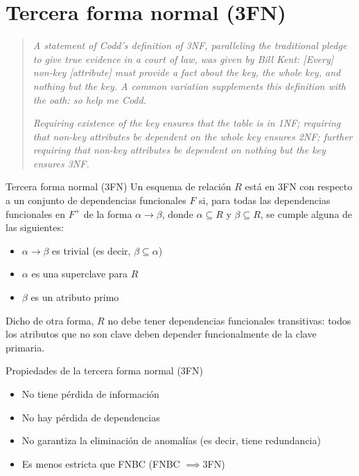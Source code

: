 \documentclass[a4paper, twoside]{article}
\begin{document}
\section{Tercera forma normal (3FN)}
\begin{quote}
	\emph{A statement of Codd's definition of 3NF, paralleling the traditional pledge to give true evidence in a court of law, was given by Bill Kent: [Every] non-key [attribute] must provide a fact about the key, the whole key, and nothing but the key. A common variation supplements this definition with the oath: so help me Codd.}

	\emph{Requiring existence of the key ensures that the table is in 1NF; requiring that non-key attributes be dependent on the whole key ensures 2NF; further requiring that non-key attributes be dependent on nothing but the key ensures 3NF.}
\end{quote}

\begin{definicion}[0.9\textwidth]{Tercera forma normal (3FN)}
	Un esquema de relación $R$ está en 3FN con respecto a un conjunto de dependencias funcionales $F$ si, para todas las dependencias funcionales en $F^{+}$ de la forma $\alpha \to \beta$, donde $\alpha \subseteq R$ y $\beta \subseteq R$, se cumple alguna de las siguientes:
	\begin{itemize}
		\item $\alpha\to\beta$ es trivial (es decir, $\beta\subseteq\alpha$)
		\item $\alpha$ es una superclave para $R$ 
		\item $\beta$ es un atributo primo
	\end{itemize}
	Dicho de otra forma, $R$ no debe tener dependencias funcionales transitivas: todos los atributos que no son clave deben depender funcionalmente de la clave primaria.
\end{definicion}

\begin{propiedades}[0.9\textwidth]{Propiedades de la tercera forma normal (3FN)}
\begin{itemize}
	\item No tiene pérdida de información
	\item No hay pérdida de dependencias
	\item No garantiza la eliminación de anomalías (es decir, tiene redundancia)
	\item Es menos estricta que FNBC (FNBC $\implies$3FN)
\end{itemize}
\end{propiedades}
\end{document}
